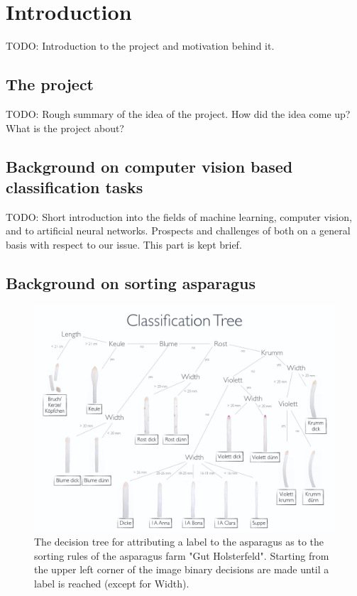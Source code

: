 \section{Introduction}

TODO: Introduction to the project and motivation behind it.

\subsection{The project}

TODO: Rough summary of the idea of the project.
How did the idea come up?
What is the project about?

\subsection{Background on computer vision based classification tasks}

TODO: Short introduction into the fields of machine learning, computer vision, and to artificial neural networks. Prospects and challenges of both on a general basis with respect to our issue. This part is kept brief.

\subsection{Background on sorting asparagus}

\begin{figure}[h]
	\centering
	\includegraphics[scale=0.35]{Figures/chapter01/fig_tree_with_title}
	\decoRule
	\caption[Decision tree for labels]{The decision tree for attributing a label to the asparagus as to the sorting rules of the asparagus farm "Gut Holsterfeld". Starting from the upper left corner of the image binary decisions are made until a label is reached (except for Width).}
	\label{fig:LabelTree}
\end{figure}

